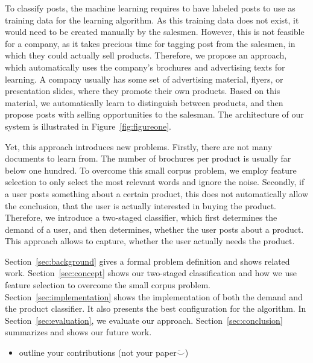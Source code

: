 To classify posts, the machine learning requires to have labeled posts to use as training data for the learning algorithm.
As this training data does not exist, it would need to be created manually by the salesmen.
However, this is not feasible for a company, as it takes precious time for tagging post from the salesmen, in which they could actually sell products.
Therefore, we propose an approach, which automatically uses the company's brochures and advertising texts for learning.
A company usually has some set of advertising material, flyers, or presentation slides, where they promote their own products.
Based on this material, we automatically learn to distinguish between products, and then propose posts with selling opportunities to the salesman.
The architecture of our system is illustrated in Figure~\ref{fig:figureone}.

Yet, this approach introduces new problems.
Firstly, there are not many documents to learn from.
The number of brochures per product is usually far below one hundred.
To overcome this small corpus problem, we employ feature selection to only select the most relevant words and ignore the noise.
Secondly, if a user posts something about a certain product, this does not automatically allow the conclusion, that the user is actually interested in buying the product.
Therefore, we introduce a two-staged classifier, which first determines the demand of a user, and then determines, whether the user posts about a product.
This approach allows to capture, whether the user actually needs the product.

Section~\ref{sec:background} gives a formal problem definition and shows related work.
Section~\ref{sec:concept} shows our two-staged classification and how we use feature selection to overcome the small corpus problem.
Section~\ref{sec:implementation} shows the implementation of both the demand and the product classifier.
It also presents the best configuration for the algorithm.
In Section~\ref{sec:evaluation}, we evaluate our approach.
Section~\ref{sec:conclusion} summarizes and shows our future work.

\begin{itemize}
	\item outline your contributions (not your paper$\ddot\smile$)
\end{itemize}

